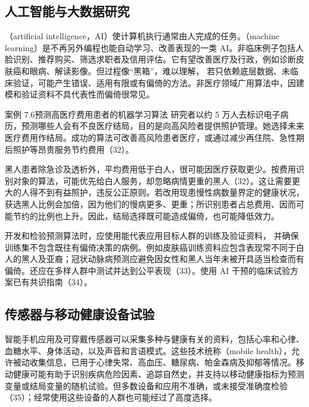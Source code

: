 \subsection{人工智能与大数据研究}
（artificial intelligence，AI）使计算机执行通常由人完成的任务。（machine learning）是不再另外编程也能自动学习、改善表现的一类 AI。非临床例子包括人脸识别、推荐购买、筛选求职者及信用评估。它有望改善医疗及行政，例如诊断皮肤癌和眼病、解读影像。但过程像“黑箱”，难以理解，
若只依赖底层数据、未临床验证，可能产生错误、适用有限或有偏倚的方法。非医疗领域广用算法中，因建模和验证资料不具代表性而偏倚很常见。
\begin{bookbox}{案例 7.6\quad 预测高医疗费用患者的机器学习算法}
研究者以约 5 万人去标识电子病历，预测哪些人会有不良医疗结局，目的是向高风险者提供照护管理。她选择未来医疗费用作结局。成功的算法可改善高风险患者医疗，或通过减少再住院、急性期后照护等昂贵服务节约费用（32）。
\end{bookbox}
黑人患者除急诊及透析外，平均费用低于白人，很可能因医疗获取更少。按费用识别对象的算法，可能优先给白人服务，却忽略病情更重的黑人（32）。这让需要更大的人得不到有益照护，违反公正原则。若改用现患慢性病数量界定的健康状况，获选黑人比例会加倍，因为他们的慢病更多、更重；所识别患者占总费用、因而可能节约的比例也上升。因此，结局选择既可能造成偏倚，也可能降低效力。

开发和检验预测算法时，应使用能代表应用目标人群的训练及验证资料，
并确保训练集不包含既往有偏倚决策的病例。例如皮肤癌训练资料应包含表现常不同于白人的黑人及亚裔；冠状动脉病预测应避免因女性和黑人当年未被开具适当检查而有偏倚。还应在多样人群中测试并达到公平表现（33）。使用 AI 干预的临床试验方案已有共识指南（34）。

\subsection{传感器与移动健康设备试验}
智能手机应用及可穿戴传感器可以采集多种与健康有关的资料，包括心率和心律、血糖水平、身体活动，以及声音和言语模式。这些技术统称（mobile health），允许被动收集信息，已用于心律失常、高血压、糖尿病、帕金森病及抑郁等情况。移动健康可能有助于识别疾病危险因素、追踪自然史，并支持以移动健康指标为预测变量或结局变量的随机试验。但多数设备和应用不准确，或未接受准确度检验（35）；经常使用这些设备的人群也可能经过了高度选择。


